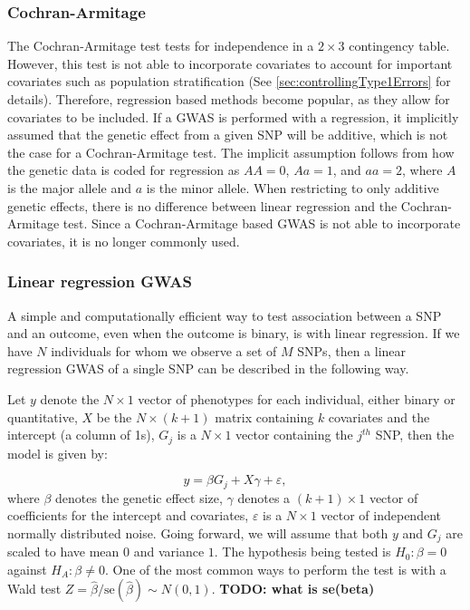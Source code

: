 \subsubsection{Cochran-Armitage}
The Cochran-Armitage test tests for independence in a $ 2\times 3 $ contingency table. However, this test is not able to incorporate covariates to account for important covariates such as population stratification (See \cref{sec:controllingType1Errors} for details). Therefore, regression based methods become popular, as they allow for covariates to be included. If a GWAS is performed with a regression, it implicitly assumed that the genetic effect from a given SNP will be additive, which is not the case for a Cochran-Armitage test. The implicit assumption follows from how the genetic data is coded for regression as $ AA = 0 $, $ Aa = 1 $, and $ aa = 2 $, where $ A $ is the major allele and $ a $ is the minor allele\cite{zeng2015statistical}. When restricting to only additive genetic effects, there is no difference between linear regression and the Cochran-Armitage test\cite{prive2019making}. Since a Cochran-Armitage based GWAS is not able to incorporate covariates, it is no longer commonly used.

\subsubsection{Linear regression GWAS}
A simple and computationally efficient way to test association between a SNP and an outcome, even when the outcome is binary, is with linear regression. If we have $ N $ individuals for whom we observe a set of $ M $ SNPs, then a linear regression GWAS of a single SNP can be described in the following way.

Let $ y $ denote the $ N\times1 $ vector of phenotypes for each individual, either binary or quantitative, $ X $ be the $ N \times (k+1) $ matrix containing $ k $ covariates and the intercept (a column of 1s), $ G_j $ is a $ N\times 1 $ vector containing the $ j^{th} $ SNP, then the model is given by:

\begin{equation}\label{eq:baseGWAS}
y = \beta G_{j} +  X\gamma + \varepsilon,
\end{equation}
where $ \beta $ denotes the genetic effect size, $ \gamma $ denotes a $ (k + 1) \times 1$ vector of coefficients for the intercept and covariates, $ \varepsilon $ is a $ N \times 1 $ vector of independent normally distributed noise. Going forward, we will assume that both $ y $ and $ G_j $ are scaled to have mean $ 0 $ and variance $ 1 $. The hypothesis being tested is $ H_0: \beta = 0 $ against $ H_A: \beta \neq 0 $. One of the most common ways to perform the test is with a Wald test $ Z = \hat{\beta}/\text{se}(\hat{\beta}) \sim N(0,1)$. \textbf{TODO: what is se(beta)}
 
